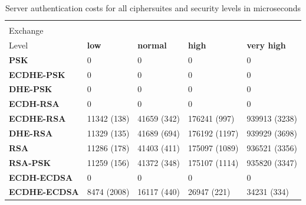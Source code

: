 		  \begin{table}[]
			\begin{tabular}{|l|l|l|l|l|}
			\hline
			\backslashbox{Key\\Exchange}{Security\\Level}                    & \textbf{low} & \textbf{normal} & \textbf{high} & \textbf{very high} \\ \hline
			\textbf{PSK}         & 0            & 0               & 0             & 0                  \\ \hline
			\textbf{ECDHE-PSK}   & 0            & 0               & 0             & 0                  \\ \hline
			\textbf{DHE-PSK}     & 0            & 0               & 0             & 0                  \\ \hline
			\textbf{ECDH-RSA}    & 0            & 0               & 0             & 0                  \\ \hline
			\textbf{ECDHE-RSA}   & 11342 (138)   & 41659 (342)      & 176241 (997)   & 939913 (3238)       \\ \hline
			\textbf{DHE-RSA}     & 11329 (135)   & 41689 (694)      & 176192 (1197)  & 939929 (3698)       \\ \hline
			\textbf{RSA}         & 11286 (178)   & 41403 (411)      & 175097 (1089)  & 936521 (3356)       \\ \hline
			\textbf{RSA-PSK}     & 11259 (156)   & 41372 (348)      & 175107 (1114)  & 935820 (3347)       \\ \hline
			\textbf{ECDH-ECDSA}  & 0            & 0               & 0             & 0                  \\ \hline
			\textbf{ECDHE-ECDSA} & 8474 (2008)   & 16117 (440)      & 26947 (221)    & 34231 (334)         \\ \hline
			\end{tabular}
			\caption{Server authentication costs for all ciphersuites and security levels in microseconds}
			\label{table:server-auth-costs-papi}
			\end{table}
  
